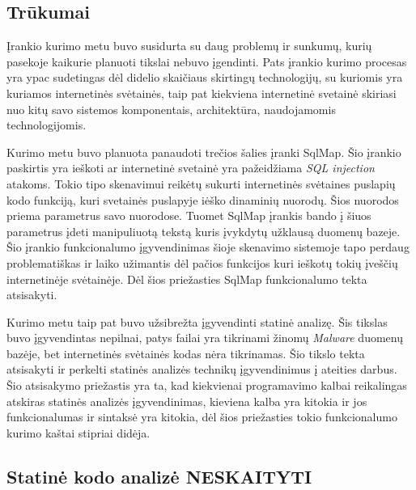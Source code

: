 \documentclass[a4paper,12pt,fleqn]{article}
\begin{document}
\subsection{Trūkumai}
\label{sec:example}

Įrankio kurimo metu buvo susidurta su daug problemų ir sunkumų, kurių pasekoje kaikurie planuoti tikslai nebuvo įgendinti. Pats įrankio kurimo procesas yra ypac sudetingas dėl didelio skaičiaus skirtingų technologijų, su kuriomis yra kuriamos internetinės svėtainės, taip pat kiekviena internetinė svetainė skiriasi nuo kitų savo sistemos komponentais, architektūra, naudojamomis technologijomis.

Kurimo metu buvo planuota panaudoti trečios šalies įranki SqlMap. Šio įrankio paskirtis yra ieškoti ar internetinė svetainė yra pažeidžiama \textit{SQL injection} atakoms. Tokio tipo skenavimui reikėtų sukurti internetinės svėtaines puslapių kodo funkciją, kuri svetainės puslapyje iėško dinaminių nuorodų. Šios nuorodos priema parametrus savo nuorodose. Tuomet SqlMap įrankis bando į šiuos parametrus įdeti manipuliuotą tekstą kuris įvykdytų užklausą duomenų bazeje. Šio įrankio funkcionalumo įgyvendinimas šioje skenavimo sistemoje tapo perdaug problematiškas ir laiko užimantis dėl pačios funkcijos kuri ieškotų tokių įveščių internetinėje svėtainėje. Dėl šios priežasties SqlMap funkcionalumo tekta atsisakyti.

Kurimo metu taip pat buvo užsibrežta įgyvendinti statinė analizę. Šis tikslas buvo įgyvendintas nepilnai, patys failai yra tikrinami žinomų \textit{Malware} duomenų bazėje, bet internetinės svėtainės kodas nėra tikrinamas. Šio tikslo tekta atsisakyti ir perkelti statinės analizės technikų įgyvendinimus į ateities darbus. Šio atsisakymo priežastis yra ta, kad kiekvienai programavimo kalbai reikalingas atskiras statinės analizės įgyvendinimas, kieviena kalba yra kitokia ir jos funkcionalumas ir sintaksė yra kitokia, dėl šios priežasties tokio funkcionalumo kurimo kaštai stipriai didėja.





\subsection{Statinė kodo analizė NESKAITYTI}
\end{document}
